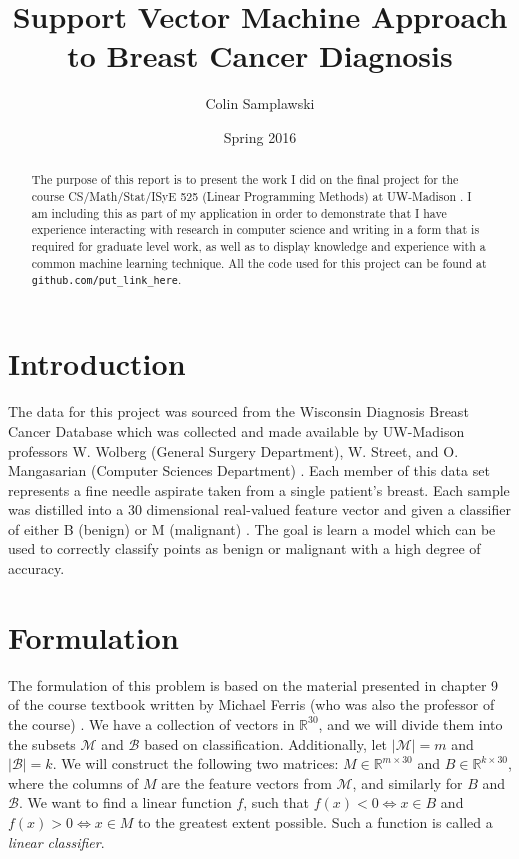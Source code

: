 \documentclass[10pt]{article}
\title{Support Vector Machine Approach to Breast Cancer Diagnosis}
\author{Colin Samplawski}
\date{Spring 2016}
\begin{document}
\maketitle
\renewcommand{\abstractname}{Preface}
\begin{abstract}
The purpose of this report is to present the work I did on the final project for the course 
CS/Math/Stat/ISyE 525 (Linear Programming Methods) at UW-Madison \cite{525}. I am 
including this as part of my application in order to demonstrate that I have experience 
interacting with research in computer science and writing in a form that is required for 
graduate level work, as well as to display knowledge and experience with a common machine learning technique. All the code used for this project can be found at \texttt{github.com/put\_link\_here}.
\end{abstract}

\section{Introduction}
The data for this project was sourced from the Wisconsin Diagnosis Breast Cancer 
Database which was collected and made available by UW-Madison professors W. Wolberg 
(General Surgery Department), W. Street, and O. Mangasarian (Computer Sciences 
Department) \cite{dataset}. Each member of this data set represents a fine needle aspirate 
taken from a single patient's breast. Each sample was distilled into a 30 dimensional 
real-valued feature vector and given a classifier of either B (benign) or M (malignant) 
\cite{features}. The goal is learn a model which can be used to correctly classify points as benign or malignant with a high degree of accuracy.

\section{Formulation}
The formulation of this problem is based on the material presented in chapter 9 of the 
course textbook written by Michael Ferris (who was also the professor of the course) \cite{textbook}. We have a collection of vectors in $\mathbb{R}^{30}$, and we will divide them into the subsets $\mathcal{M}$ and $\mathcal{B}$ based on classification. Additionally, let $|\mathcal{M}| = m$ and $|\mathcal{B}| = k$. We will construct the following two matrices: $M \in \mathbb{R}^{m \times 30}$ and $B \in \mathbb{R}^{k \times 30}$, where the columns of $M$ are the feature vectors from $\mathcal{M}$, and similarly for $B$ and $\mathcal{B}$. We want to find a linear function $f$, such that $f(x) < 0 \Leftrightarrow x \in B$ and $f(x) > 0 \Leftrightarrow  x \in M$ to the greatest extent possible. Such a function is called a \textit{linear classifier}.
\end{document}
